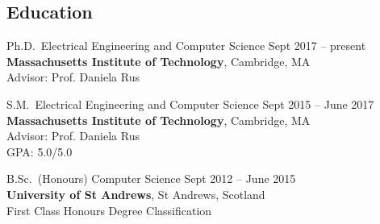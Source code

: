 \documentclass[line,margin]{cv}
\begin{document}
\address{Email: \href{mailto:wallar@mit.edu}{wallar@mit.edu}
\\Website: \href{http://wallar.me}
{http://wallar.me}, Phone: +1 240-470-8493}
\address{32 Vassar St. Room 376, Cambridge, MA 02139}

\begin{resume}

%

\section{Education}

Ph.D.\ Electrical Engineering and Computer Science
\hfill Sept 2017 -- present\\
\textbf{Massachusetts Institute of Technology}, Cambridge, MA\\
Advisor: Prof. Daniela Rus

S.M.\ Electrical Engineering and Computer Science
\hfill Sept 2015 -- June 2017\\
\textbf{Massachusetts Institute of Technology}, Cambridge, MA\\
Advisor: Prof. Daniela Rus\\
GPA: 5.0/5.0

%
%

B.Sc.\ (Honours) Computer Science
\hfill Sept 2012 -- June 2015 \\
\textbf{University of St Andrews}, St Andrews, Scotland\\
First Class Honours Degree Classification


\end{resume}
\end{document}
